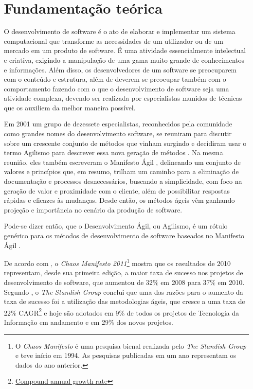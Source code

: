 \chapter{Fundamentação teórica}
\label{cha:fundamentacao_teorica}

O desenvolvimento de software é o ato de elaborar e implementar um sistema computacional que transforme as necessidades de um utilizador ou de um mercado em um produto de software. É uma atividade essencialmente intelectual e criativa, exigindo a manipulação de uma gama muito grande de conhecimentos e informações. Além disso, os desenvolvedores de um software se preocuparem com o conteúdo e estrutura, além de deverem se preocupar também com o comportamento fazendo com o que o desenvolvimento de software seja uma atividade complexa, devendo ser realizada por especialistas munidos de técnicas que os auxiliem da melhor maneira possível.

Em 2001 um grupo de dezessete especialistas, reconhecidos pela comunidade como grandes nomes do desenvolvimento software, se reuniram para discutir sobre um crescente conjunto de métodos que vinham surgindo e decidiram usar o termo Agilismo para descrever essa nova geração de métodos \cite{AgileStory}. Na mesma reunião, eles também escreveram o Manifesto Ágil \cite{AgileManifesto}, delineando um conjunto de valores e princípios que, em resumo, trilham um caminho para a eliminação de documentação e processos desnecessários, buscando a simplicidade, com foco na geração de valor e proximidade com o cliente, além de possibilitar respostas rápidas e eficazes às mudanças. Desde então, os métodos ágeis vêm ganhando projeção e importância no cenário da produção de software.

Pode-se dizer então, que o Desenvolvimento Ágil, ou Agilismo, é um rótulo genérico para os métodos de desenvolvimento de software baseados no Manifesto Ágil \cite{BDDRodrigo}.

De acordo com , o \textit{Chaos Manifesto 2011}\footnote{O \textit{Chaos Manifesto} é uma pesquisa bienal realizada pelo \textit{The Standish Group} e teve início em 1994. As pesquisas publicadas em um ano representam os dados do ano anterior.} mostra que os resultados de 2010 representam, desde sua primeira edição, a maior taxa de sucesso nos projetos de desenvolvimento de software, que aumentou de 32\% em 2008 para 37\% em 2010. Segundo , o \textit{The Standish Group} conclui que uma das razões para o aumento da taxa de sucesso foi a utilização das metodologias ágeis, que cresce a uma taxa de 22\% CAGR\footnote{\href{http://en.wikipedia.org/wiki/Compound_annual_growth_rate} {Compound annual growth rate}} e hoje são adotados em 9\% de todos os projetos de Tecnologia da Informação em andamento e em 29\% dos novos projetos.

